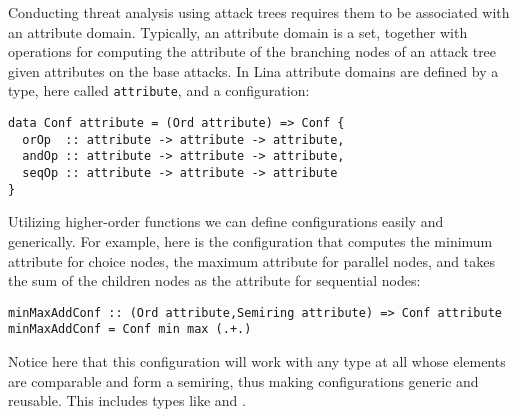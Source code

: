 Conducting threat analysis using attack trees requires them to be
associated with an attribute domain.  Typically, an attribute domain
is a set, together with operations for computing the attribute of the
branching nodes of an attack tree given attributes on the base
attacks.  In Lina attribute domains are defined by a type, here called
\verb!attribute!, and a configuration:
\begin{center}
  \begin{verbatim}
data Conf attribute = (Ord attribute) => Conf {
  orOp  :: attribute -> attribute -> attribute,    
  andOp :: attribute -> attribute -> attribute,
  seqOp :: attribute -> attribute -> attribute
}
\end{verbatim}
\end{center}
Utilizing higher-order functions we can define configurations easily
and generically.  For example, here is the configuration that computes
the minimum attribute for choice nodes, the maximum attribute for
parallel nodes, and takes the sum of the children nodes as the
attribute for sequential nodes:
\begin{center}
  \begin{verbatim}
minMaxAddConf :: (Ord attribute,Semiring attribute) => Conf attribute
minMaxAddConf = Conf min max (.+.)
\end{verbatim}
\end{center}
Notice here that this configuration will work with any type at all
whose elements are comparable and form a semiring, thus making
configurations generic and reusable.  This includes types like
 and .

